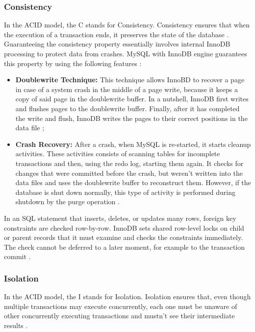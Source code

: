 \documentclass[12pt]{article}
\begin{document}
\subsubsection{Consistency}
\label{consistency} 
In the ACID model, the C stands for Consistency. Consistency ensures that when the execution of a transaction ends, it preserves the state of the database \parencite{AulaTransactions}. Guaranteeing the consistency property essentially involves internal InnoDB processing to protect data from crashes. MySQL with InnoDB engine guarantees this property by using the following features \parencite{innodbACID}: 

\begin{itemize}
    \item \textbf{Doublewrite Technique:} This technique allows InnoBD to recover a page in case of a system crash in the middle of a page write, because it keeps a copy of said page in the doublewrite buffer. In a nutshell, InnoDB first writes and flushes pages to the doublewrite buffer. Finally, after it has completed the write and flush, InnoDB writes the pages to their correct positions in the data file \parencite{doublewriteBufferGloss};

     \item \textbf{Crash Recovery:} After a crash, when MySQL is re-started, it starts cleanup activities. These activities consists of scanning tables for incomplete transactions and then, using the redo log, starting them again. It checks for changes that were committed before the crash, but weren't written into the data files and uses the doublewrite buffer to reconstruct them. However, if the database is shut down normally, this type of activity is performed during shutdown by the purge operation \parencite{crashRecoveryGloss}.
     
\end{itemize}

\vspace{0.3cm}

In an SQL statement that inserts, deletes, or updates many rows, foreign key constraints are checked row-by-row. InnoDB sets shared row-level locks on child or parent records that it must examine and checks the constraints immediately. The check cannot be deferred to a later moment, for example to the transaction commit \parencite{fkDeferConstraint}.

\subsubsection{Isolation}
\label{isolation}
In the ACID model, the I stands for Isolation. Isolation ensures that, even though multiple transactions may execute concurrently, each one must be unaware of other concurrently executing transactions and mustn't see their intermediate results \parencite{AulaTransactions}.
\end{document}
